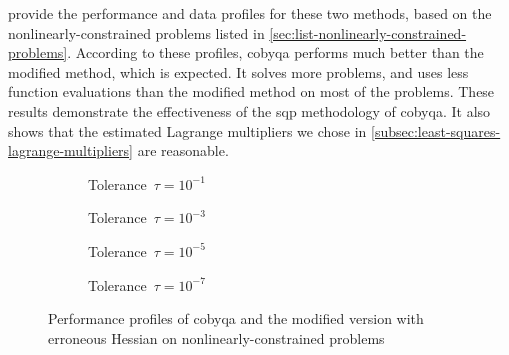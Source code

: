  provide the performance and data profiles for these two methods, based on the nonlinearly-constrained problems listed in \cref{sec:list-nonlinearly-constrained-problems}.
According to these profiles, \gls{cobyqa} performs much better than the modified method, which is expected.
It solves more problems, and uses less function evaluations than the modified method on most of the problems.
These results demonstrate the effectiveness of the \gls{sqp} methodology of \gls{cobyqa}.
It also shows that the estimated Lagrange multipliers we chose in \cref{subsec:least-squares-lagrange-multipliers} are reasonable.

\begin{figure}[ht]
    \centering
    \begin{subfigure}[b]{0.49\textwidth}
        \centering
        \caption{Tolerance~$\tau = 10^{-1}$}
    \end{subfigure}
    \hfill
    \begin{subfigure}[b]{0.49\textwidth}
        \centering
        \caption{Tolerance~$\tau = 10^{-3}$}
    \end{subfigure}
    \begin{subfigure}[b]{0.49\textwidth}
        \centering
        \caption{Tolerance~$\tau = 10^{-5}$}
    \end{subfigure}
    \hfill
    \begin{subfigure}[b]{0.49\textwidth}
        \centering
        \caption{Tolerance~$\tau = 10^{-7}$}
    \end{subfigure}
    \caption{Performance profiles of \gls{cobyqa} and the modified version with erroneous Hessian on nonlinearly-constrained problems}
    \label{fig:perf-wrong-hessian}
\end{figure}

